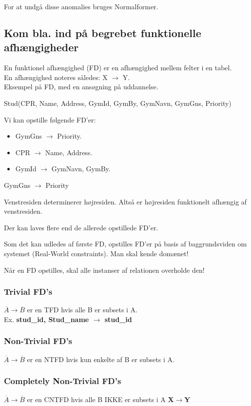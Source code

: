 For at undgå disse anomalies bruges Normalformer.

\subsection{Kom bla. ind på begrebet funktionelle afhængigheder}
En funktionel afhængighed (FD) er en afhængighed mellem felter i en tabel.\\
En afhængighed noteres således: X $\rightarrow$ Y.\\
Eksempel på FD, med en ansøgning på uddannelse.

Stud(CPR, Name, Address, GymId, GymBy, GymNavn, GymGns, Priority)

Vi kan opstille følgende FD'er:
\begin{itemize}
	\item GymGns $\rightarrow$ Priority.
	\item CPR $\rightarrow$ Name, Address.
	\item GymId $\rightarrow$ GymNavn, GymBy.
\end{itemize}GymGns $\rightarrow$ Priority

Venstresiden determinerer højresiden. Altså er højresiden funktionelt afhængig af venstresiden.

Der kan laves flere end de allerede opstillede FD'er.

Som det kan udledes af første FD, opstilles FD'er på basis af baggrundsviden om systemet (Real-World constraints). Man skal kende domænet!

Når en FD opstilles, skal alle instanser af relationen overholde den!



\subsubsection{Trivial FD's}

$\overline{A} \rightarrow \overline{B}$ er en TFD hvis alle B er subsets i A.\\
Ex. \textbf{stud\_id, Stud\_name $\rightarrow$ stud\_id}

\subsubsection{Non-Trivial FD's}
$\overline{A} \rightarrow \overline{B}$ er en NTFD hvis kun enkelte af B er subsets i A.
\subsubsection{Completely Non-Trivial FD's}
$\overline{A} \rightarrow \overline{B}$ er en CNTFD hvis alle B IKKE er subsets i A
\textbf{X$\rightarrow$Y}
